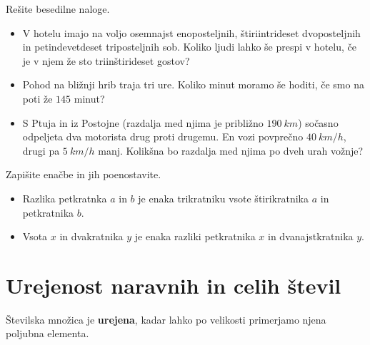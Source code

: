                     \begin{naloga}
                        Rešite besedilne naloge.
                        \begin{itemize}
                            \item V hotelu imajo na voljo osemnajst enoposteljnih, štiriintrideset dvoposteljnih in petindevetdeset triposteljnih sob.
                                Koliko ljudi lahko še prespi v hotelu, če je v njem že sto triinštirideset gostov?      
                            \item Pohod na bližnji hrib traja tri ure. Koliko minut moramo še hoditi, če smo na poti že $145$ minut?       
                            \item S Ptuja in iz Postojne (razdalja med njima je približno $190~km$) sočasno odpeljeta dva motorista drug proti drugemu.
                                En vozi povprečno $40~km/h$, drugi pa $5~km/h$ manj. Kolikšna bo razdalja med njima po dveh urah vožnje?      
                        \end{itemize}
                    \end{naloga}
        
                    \begin{naloga}
                        Zapišite enačbe in jih poenostavite.
                        \begin{itemize}
                            \item Razlika petkratnka $a$ in $b$ je enaka trikratniku vsote štirikratnika $a$ in petkratnika $b$.   
                            \item Vsota $x$ in dvakratnika $y$ je enaka razliki petkratnika $x$ in dvanajstkratnika $y$.    
                        \end{itemize}
                    \end{naloga}


                    
\newpage
\section{Urejenost naravnih in celih števil}


    
        Številska množica je \textbf{urejena}, kadar lahko po velikosti primerjamo njena poljubna elementa.
    

